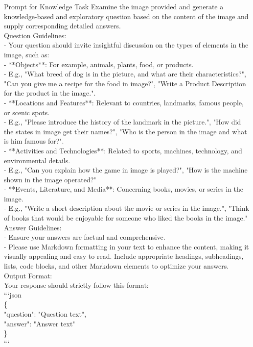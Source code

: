 \begin{figure*}[!ht] 
\begin{AIbox}{Prompt for Knowledge Task}
{Examine the image provided and generate a knowledge-based and exploratory question based on the content of the image and supply corresponding detailed answers.\\
 Question Guidelines:\\
- Your question should invite insightful discussion on the types of elements in the image, such as:\\
  - **Objects**: For example, animals, plants, food, or products.\\
    - E.g., "What breed of dog is in the picture, and what are their characteristics?", "Can you give me a recipe for the food in image?", "Write a Product Description for the product in the image.".\\
  - **Locations and Features**: Relevant to countries, landmarks, famous people, or scenic spots.\\
    - E.g., "Please introduce the history of the landmark in the picture.", "How did the states in image get their names?", "Who is the person in the image and what is him famous for?".\\
  - **Activities and Technologies**: Related to sports, machines, technology, and environmental details.\\
    - E.g., "Can you explain how the game in image is played?", "How is the machine shown in the image operated?"\\
  - **Events, Literature, and Media**: Concerning books, movies, or series in the image.\\
    - E.g., "Write a short description about the movie or series in the image.", "Think of books that would be enjoyable for someone who liked the books in the image."\\

 Answer Guidelines:\\
- Ensure your answers are factual and comprehensive.\\
- Please use Markdown formatting in your text to enhance the content, making it visually appealing and easy to read. Include appropriate headings, subheadings, lists, code blocks, and other Markdown elements to optimize your answers.\\
 Output Format:\\
Your response should strictly follow this format:\\
```json\\
\{\\
  "question": "Question text",\\
  "answer": "Answer text"\\
\}\\
```
}
\end{AIbox} 
\caption{\textbf{An Example of the prompt for Knowledge task generation. }}
\label{fig: prompt_kn}
\end{figure*}

